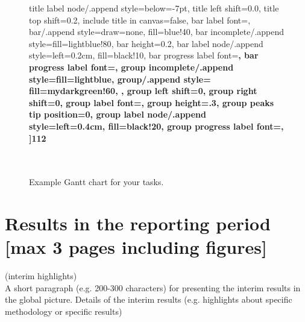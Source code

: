 \documentclass[11pt,a4paper]{article}
\begin{document}
\begin{itemize}
\begin{figure}[h]
\begin{center}
\begin{ganttchart}
			title label node/.append style={below=-7pt},
			title left shift=0.0,
			title top shift=0.2,
			include title in canvas=false,
			bar label font=\mdseries\small\color{black!90},
			bar/.append style={draw=none, fill=blue!40},
			bar incomplete/.append style={fill=lightblue!80},
			bar height=0.2,
			bar label node/.append style={left=0.2cm, fill=black!10},
			bar progress label font=\bfseries\small,
			bar progress label font=\mdseries\footnotesize\color{black!80},
			group incomplete/.append style={fill=lightblue},
			group/.append style={
				fill=mydarkgreen!60, %
			},
			group left shift=0,
			group right shift=0,
			group label font=\mdseries\bfseries\small\color{black!90},
			group height=.3,
			group peaks tip position=0,
			group label node/.append style={left=0.4cm, fill=black!20},
			group progress label font=\mdseries\footnotesize\color{black!80},
			]{1}{12}
			 \\
			[grid]
			 \\
			[grid]
			 \\
			[grid]
		\end{ganttchart}
	\end{center}
	\caption{Example Gantt chart for your tasks.}
\end{figure}

\end{itemize}
\section{Results in the reporting period [max 3 pages including figures]}
(interim highlights)  \\
A short paragraph (e.g. 200-300 characters) for presenting the interim results in the global picture. Details of the interim results (e.g. highlights about specific methodology or specific results) 
\end{document}
